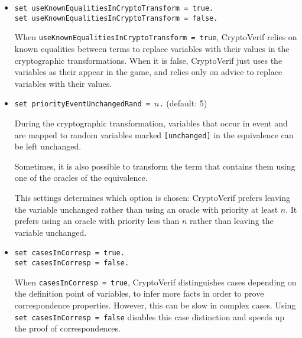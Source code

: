 \begin{itemize}
\begin{itemize}
\item \texttt{set useKnownEqualitiesInCryptoTransform = true.}\\
\texttt{set useKnownEqualitiesInCryptoTransform = false.}

When \texttt{useKnownEqualitiesInCryptoTransform = true}, CryptoVerif
relies on known equalities between terms to replace variables with
their values in the cryptographic transformations.
When it is false, CryptoVerif just uses the variables as their
appear in the game, and relies only on advice to replace variables
with their values. 

\item \texttt{set priorityEventUnchangedRand = $n$.} (default: 5)

During the cryptographic transformation, variables that occur in event
and are mapped to random variables marked \texttt{[unchanged]} in the
equivalence can be left unchanged.

Sometimes, it is also possible to transform the term that contains
them using one of the oracles of the equivalence.

This settings determines which option is chosen: CryptoVerif prefers
leaving the variable unchanged rather than using an oracle with
priority at least $n$. It prefers using an oracle with priority
less than $n$ rather than leaving the variable unchanged.

\item \texttt{set casesInCorresp = true.}\\
\texttt{set casesInCorresp = false.}

When \texttt{casesInCorresp = true}, CryptoVerif distinguishes
cases depending on the definition point of variables, to infer
more facts in order to prove correspondence properties.
However, this can be slow in complex cases. Using
\texttt{set casesInCorresp = false} disables this case
distinction and speeds up the proof of correspondences.

% 


\end{itemize}
\end{itemize}
